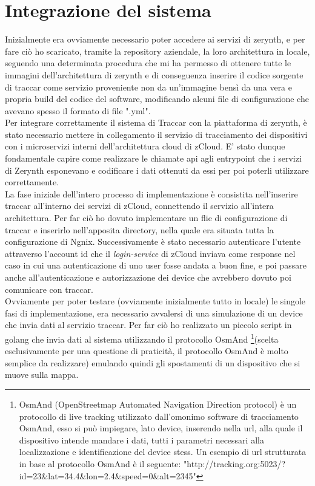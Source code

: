 \documentclass[a4paper,titlepage,12pt]{book}
\begin{document}
\sffamily
\chapter{
\sffamily Integrazione del sistema}
Inizialmente era ovviamente necessario poter accedere ai servizi di zerynth, e per fare ciò ho scaricato, tramite la repository aziendale, la loro architettura in locale, seguendo una determinata procedura che mi ha permesso di ottenere tutte le immagini dell'architettura di zerynth e di conseguenza inserire il codice sorgente di traccar come servizio proveniente non da un'immagine bensì da una vera e propria build del codice del software, modificando alcuni file di configurazione che avevano spesso il formato di file ".yml".\\
Per integrare correttamente il sistema di Traccar con la piattaforma di zerynth, è stato necessario mettere in collegamento il servizio di tracciamento dei dispositivi con i microservizi interni dell'architettura cloud di zCloud. E' stato dunque fondamentale capire come realizzare le chiamate api agli entrypoint che i servizi di Zerynth esponevano e codificare i dati ottenuti da essi per poi poterli utilizzare correttamente. \\
La fase iniziale dell'intero processo di implementazione è consistita nell'inserire traccar all'interno dei servizi di zCloud, connettendo il servizio all'intera architettura. Per far ciò ho dovuto implementare un flie di configurazione di traccar e inserirlo nell'apposita directory, nella quale era situata tutta la configurazione di Ngnix. Successivamente è stato necessario autenticare l'utente attraverso l'account id che il \textit{login-service} di zCloud inviava come response nel caso in cui una autenticazione di uno user fosse andata a buon fine, e poi passare anche all'autenticazione e autorizzazione dei device che avrebbero dovuto poi comunicare con traccar. \\
Ovviamente per poter testare (ovviamente inizialmente tutto in locale) le singole fasi di implementazione, era necessario avvalersi di una simulazione di un device che invia dati al servizio traccar. Per far ciò ho realizzato un piccolo script in golang che invia dati al sistema utilizzando il protocollo OsmAnd \footnote{\sffamily OsmAnd (OpenStreetmap Automated Navigation Direction protocol) è un protocollo di live tracking utilizzato dall'omonimo software di tracciamento OsmAnd, esso si può impiegare, lato device, inserendo nella url, alla quale il dispositivo intende mandare i dati, tutti i parametri necessari alla localizzazione e identificazione del device stess. Un esempio di url strutturata in base al protocollo OsmAnd è il seguente: "http://tracking.org:5023/?id=23\&lat=34.4\&lon=2.4\&speed=0\&alt=2345"}(scelta esclusivamente per una questione di praticità, il protocollo OsmAnd è molto semplice da realizzare) emulando quindi gli spostamenti di un dispositivo che si muove sulla mappa.
\end{document}
